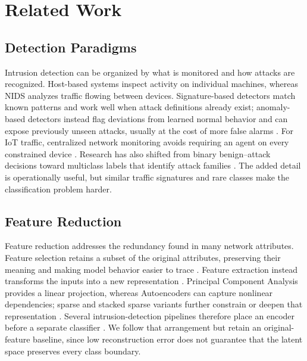 \documentclass[conference]{IEEEtran}
\begin{document}
\section{Related Work}
\subsection{Detection Paradigms}
Intrusion detection can be organized by what is monitored and how attacks are recognized. Host-based systems inspect activity on individual machines, whereas NIDS analyzes traffic flowing between devices. Signature-based detectors match known patterns and work well when attack definitions already exist; anomaly-based detectors instead flag deviations from learned normal behavior and can expose previously unseen attacks, usually at the cost of more false alarms \cite{Rahman2025,Alfahaid2025}. For IoT traffic, centralized network monitoring avoids requiring an agent on every constrained device \cite{Rahman2025,Hassan2025IoMT}. Research has also shifted from binary benign--attack decisions toward multiclass labels that identify attack families \cite{Sarhan2022,Ma2025FSLLM}. The added detail is operationally useful, but similar traffic signatures and rare classes make the classification problem harder.

\subsection{Feature Reduction}
Feature reduction addresses the redundancy found in many network attributes. Feature selection retains a subset of the original attributes, preserving their meaning and making model behavior easier to trace \cite{Li2024FSvsFE,Wakili2025}. Feature extraction instead transforms the inputs into a new representation \cite{Li2024FSvsFE,Li2024FeatureReduction}. Principal Component Analysis provides a linear projection, whereas Autoencoders can capture nonlinear dependencies; sparse and stacked sparse variants further constrain or deepen that representation \cite{Li2024FeatureReduction,Yao2023,Xiao2024,Zhang2023SIGMOD}. Several intrusion-detection pipelines therefore place an encoder before a separate classifier \cite{HariVinayak2025,Ayad2025}. We follow that arrangement but retain an original-feature baseline, since low reconstruction error does not guarantee that the latent space preserves every class boundary.
\end{document}
